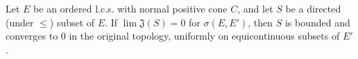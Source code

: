 Let $E$ be an ordered l.c.s. with normal positive cone $C$, and let $S$ be a directed (under $\leq$) subset of $E$. If $\lim \mathfrak{J}(S) = 0$ for $\sigma(E, E')$, then $S$ is bounded and converges to 0 in the original topology, uniformly on equicontinuous subsets of $E'$.
